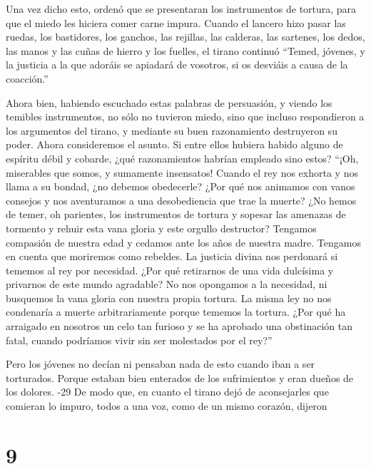  Una vez dicho esto, ordenó que se presentaran los
instrumentos de tortura, para que el miedo les hiciera comer carne
impura.  Cuando el lancero hizo pasar las ruedas, los
bastidores, los ganchos, las rejillas, las calderas, las sartenes, los
dedos, las manos y las cuñas de hierro y los fuelles, el tirano continuó
 ``Temed, jóvenes, y la justicia a la que adoráis se
apiadará de vosotros, si os desviáis a causa de la coacción.''

 Ahora bien, habiendo escuchado estas palabras de
persuasión, y viendo los temibles instrumentos, no sólo no tuvieron
miedo, sino que incluso respondieron a los argumentos del tirano, y
mediante su buen razonamiento destruyeron su poder. 
Ahora consideremos el asunto. Si entre ellos hubiera habido alguno de
espíritu débil y cobarde, ¿qué razonamientos habrían empleado sino
estos?  ``¡Oh, miserables que somos, y sumamente
insensatos! Cuando el rey nos exhorta y nos llama a su bondad, ¿no
debemos obedecerle?  ¿Por qué nos animamos con vanos
consejos y nos aventuramos a una desobediencia que trae la muerte?
 ¿No hemos de temer, oh parientes, los instrumentos de
tortura y sopesar las amenazas de tormento y rehuir esta vana gloria y
este orgullo destructor?  Tengamos compasión de nuestra
edad y cedamos ante los años de nuestra madre.  Tengamos
en cuenta que moriremos como rebeldes.  La justicia
divina nos perdonará si tememos al rey por necesidad. 
¿Por qué retirarnos de una vida dulcísima y privarnos de este mundo
agradable?  No nos opongamos a la necesidad, ni busquemos
la vana gloria con nuestra propia tortura.  La misma ley
no nos condenaría a muerte arbitrariamente porque tememos la tortura.
 ¿Por qué ha arraigado en nosotros un celo tan furioso y
se ha aprobado una obstinación tan fatal, cuando podríamos vivir sin ser
molestados por el rey?''

 Pero los jóvenes no decían ni pensaban nada de esto
cuando iban a ser torturados.  Porque estaban bien
enterados de los sufrimientos y eran dueños de los dolores.
-29 De modo que, en cuanto el tirano dejó de aconsejarles
que comieran lo impuro, todos a una voz, como de un mismo corazón,
dijeron

\hypertarget{section-8}{%
\section{9}\label{section-8}}

